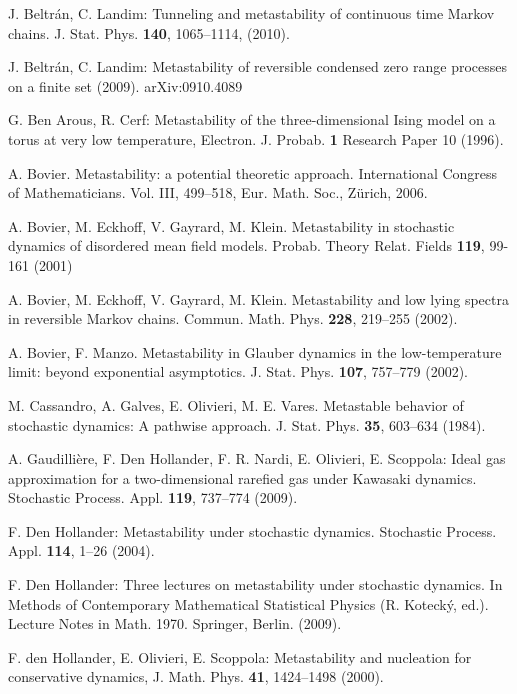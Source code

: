 \documentclass[reqno]{amsart}
\begin{document}
\begin{thebibliography}{99}

 J. Beltr\'an, C. Landim: Tunneling and metastability of
  continuous time Markov chains. J. Stat. Phys. {\bf 140}, 1065--1114,
  (2010).

 J. Beltr\'an, C. Landim: Metastability of reversible
  condensed zero range processes on a finite set
  (2009). arXiv:0910.4089

 G. Ben Arous, R. Cerf: Metastability of the
  three-dimensional Ising model on a torus at very low temperature,
  Electron. J. Probab. {\bf 1} Research Paper 10 (1996).

 A. Bovier. Metastability: a potential theoretic approach.
  International Congress of Mathematicians. Vol. III, 499--518, Eur.
  Math. Soc., Z\"{u}rich, 2006.

 A. Bovier, M. Eckhoff, V. Gayrard, M. Klein.
  Metastability in stochastic dynamics of disordered mean field
  models. Probab. Theory Relat. Fields {\bf 119}, 99-161 (2001)

 A. Bovier, M. Eckhoff, V. Gayrard, M. Klein.
  Metastability and low lying spectra in reversible Markov chains.
  Commun. Math. Phys. {\bf 228}, 219--255 (2002).

 A. Bovier, F. Manzo. Metastability in Glauber dynamics in
  the low-temperature limit: beyond exponential asymptotics. J.
  Stat. Phys. {\bf 107}, 757--779 (2002).

 M. Cassandro, A. Galves, E. Olivieri, M. E. Vares.
  Metastable behavior of stochastic dynamics: A pathwise approach.
  J. Stat. Phys. {\bf 35}, 603--634 (1984).

 A. Gaudilli\`{e}re, F. Den Hollander, F. R. Nardi, E.
  Olivieri, E. Scoppola: Ideal gas approximation for a two-dimensional
  rarefied gas under Kawasaki dynamics. Stochastic Process. Appl.
  {\bf 119}, 737--774 (2009).

 F. Den Hollander: Metastability under stochastic
  dynamics. Stochastic Process.  Appl. {\bf 114}, 1--26 (2004).
 
 F. Den Hollander: Three lectures on metastability under
  stochastic dynamics. In Methods of Contemporary Mathematical
  Statistical Physics (R. Koteck\'y, ed.). Lecture Notes in Math. 1970.
  Springer, Berlin. (2009).

 F. den Hollander, E. Olivieri, E. Scoppola:
  Metastability and nucleation for conservative dynamics,
  J. Math. Phys. {\bf 41}, 1424--1498 (2000). 


\end{thebibliography}
\end{document}
